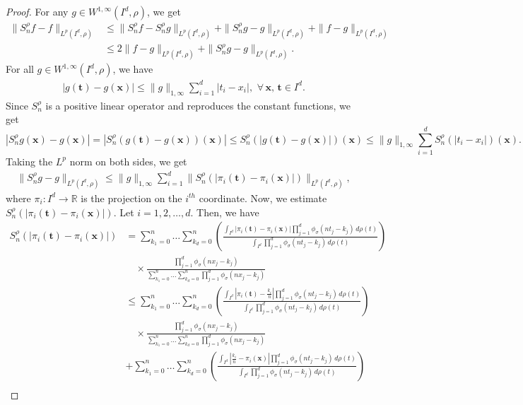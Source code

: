 \documentclass[10pt,a4paper]{amsart}
\newcommand{\LP}{L^p(I^d, \rho)}
\newcommand{\R}{\mathbb{R}}
\newcommand{\X}{\mathbf{x}}
\begin{document}
\begin{proof} %
For any $g\in W^{1,\infty}(I^d,\rho)$, we get
\begin{align}
\|S^{\rho}_nf-f\|_{\LP} &\leq \|S^{\rho}_nf-S^{\rho}_ng\|_{\LP}+\|S^{\rho}_ng-g\|_{\LP}+\|f-g\|_{\LP} \nonumber \\
 &\leq 2 \|f-g\|_{\LP}+\|S^{\rho}_ng-g\|_{\LP}. \label{mKesti}
\end{align}
For all $g\in W^{1,\infty}(I^d,\rho)$, we have \begin{align}
|g(\mathbf{t})-g(\mathbf{x})|\leq \|g\|_{1,\infty}\sum_{i=1}^d|t_i-x_i|, \,\, \forall \, \X,\,\mathbf{t}\in  I^d.\end{align}
Since $S^{\rho}_n$ is a positive linear operator and reproduces the constant functions, we get
$$|S^{\rho}_ng(\mathbf{x})-g(\mathbf{x})|=|S^{\rho}_n(g(\mathbf{t})-g(\mathbf{x}))(\mathbf{x})|\leq S^{\rho}_n(|g(\mathbf{t})-g(\mathbf{x})|)(\mathbf{x})\leq \|g\|_{1,\infty}\sum_{i=1}^d S^{\rho}_n(|t_i-x_i|)(\mathbf{x}).$$
 Taking the $L^p$ norm on both sides, we get
 \begin{align}
     \|S^{\rho}_ng-g\|_{\LP}  \leq \|g\|_{1,\infty} \sum_{i=1}^d \|S^{\rho}_n(|\pi_i(\mathbf{t})-\pi_i(\X)|)\|_{\LP}, \label{mgesti}
 \end{align}
where $\pi_i:I^d\to\R$ is the projection on the $i^{th}$ coordinate. Now, we estimate  $S^{\rho}_n(|\pi_i(\mathbf{t})-\pi_i(\X)|).$
Let $i=1,2,\ldots,d.$ Then, we have
\begin{align*}
S^{\rho}_n(|\pi_i(\mathbf{t})-\pi_i(\X)|) &=   \sum_{k_1=0}^n \ldots \sum_{k_d=0}^n \left( \frac{\int_{I^d} |\pi_i(\mathbf{t})-\pi_i(\X)| \prod_{j=1}^d \phi_\sigma(nt_j - k_j) \, d\rho(t)}{\int_{I^d} \prod_{j=1}^d \phi_\sigma(nt_j - k_j) \, d\rho(t)} \right) \\
&\quad  \times \frac{\prod_{j=1}^d \phi_\sigma(nx_j - k_j)}{\sum_{k_1=0}^n \ldots \sum_{k_d=0}^n \prod_{j=1}^d \phi_\sigma(nx_j - k_j)}   \\
&\leq   \sum_{k_1=0}^n \ldots \sum_{k_d=0}^n \left( \frac{\int_{I^d} |\pi_i(\mathbf{t}) - \frac{k_i}{n}| \prod_{j=1}^d \phi_\sigma(nt_j - k_j) \, d\rho(t)}{\int_{I^d} \prod_{j=1}^d \phi_\sigma(nt_j - k_j) \, d\rho(t)} \right)  \\
&\quad  \times \frac{\prod_{j=1}^d \phi_\sigma(nx_j - k_j)}{\sum_{k_1=0}^n \ldots \sum_{k_d=0}^n \prod_{j=1}^d \phi_\sigma(nx_j - k_j)}  \\
&+   \sum_{k_1=0}^n \ldots \sum_{k_d=0}^n \left( \frac{\int_{I^d} \left| \frac{k_i}{n} - \pi_i(\X) \right| \prod_{j=1}^d \phi_\sigma(nt_j - k_j) \, d\rho(t)}{\int_{I^d} \prod_{j=1}^d \phi_\sigma(nt_j - k_j) \, d\rho(t)} \right) \\

\end{align*}
\end{proof}
\end{document}
